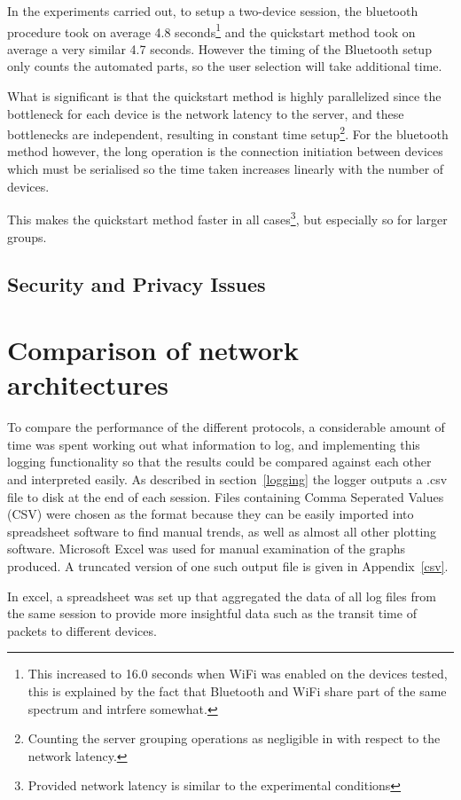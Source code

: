 In the experiments carried out, to setup a two-device session, the bluetooth procedure took on average 4.8 seconds\footnote{This increased to 16.0 seconds when WiFi was enabled on the devices tested, this is explained by the fact that Bluetooth and WiFi share part of the same spectrum and intrfere somewhat.\cite{btwifi}} and the quickstart method took on average a very similar 4.7 seconds. However the timing of the Bluetooth setup only counts the automated parts, so the user selection will take additional time.

What is significant is that the quickstart method is highly parallelized since the bottleneck for each device is the network latency to the server, and these bottlenecks are independent, resulting in constant time setup\footnote{Counting the server grouping operations as negligible in with respect to the network latency.}. For the bluetooth method however, the long operation is the connection initiation between devices which must be serialised so the time taken increases linearly with the number of devices.

This makes the quickstart method faster in all cases\footnote{Provided network latency is similar to the experimental conditions}, but especially so for larger groups.

\subsection{Security and Privacy Issues}

\section{Comparison of network architectures}

To compare the performance of the different protocols, a considerable amount of time was spent working out what information to log, and implementing this logging functionality so that the results could be compared against each other and interpreted easily.
As described in section~\ref{logging} the logger outputs a .csv file to disk at the end of each session. Files containing Comma Seperated Values (CSV) were chosen as the format because they can be easily imported into spreadsheet software to find manual trends, as well as almost all other plotting software. Microsoft Excel was used for manual examination of the graphs produced.
A truncated version of one such output file is given in Appendix~\ref{csv}.

In excel, a spreadsheet was set up that aggregated the data of all log files from the same session to provide more insightful data such as the transit time of packets to different devices.

